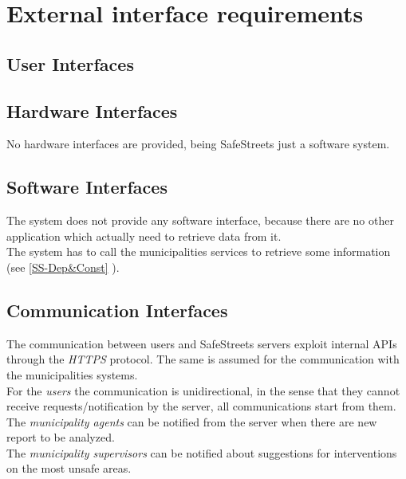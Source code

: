 \documentclass[a4paper]{report}
\begin{document}
\section{External interface requirements}
\subsection{User Interfaces}
\lipsum[1]
\subsection{Hardware Interfaces}
No hardware interfaces are provided, being SafeStreets just a software system.
\subsection{Software Interfaces}
The system does not provide any software interface, because there are no other application which actually need to retrieve data from it. \\
The system has to call the municipalities services to retrieve some information (see \ref{SS-Dep&Const} ).
\subsection{Communication Interfaces}
The communication between users and SafeStreets servers exploit internal APIs through the \textit{HTTPS} protocol. The same is assumed for the communication with the municipalities systems. \\
For the \textit{users} the communication is unidirectional, in the sense that they cannot receive requests/notification by the server, all communications start from them. \\
The \textit{municipality agents} can be notified from the server when there are new report to be analyzed. \\
The \textit{municipality supervisors} can be notified about suggestions for interventions on the most unsafe areas.
\end{document}
